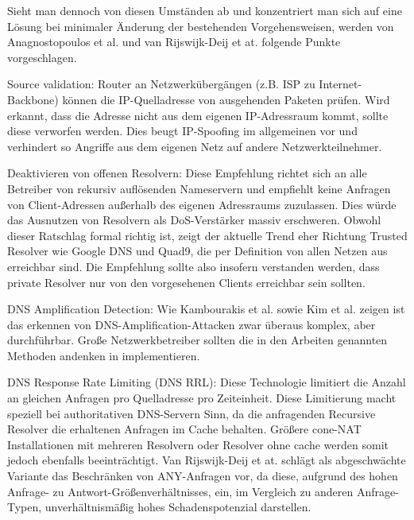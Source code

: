 Sieht man dennoch von diesen Umständen ab und konzentriert man sich auf eine Lösung bei minimaler Änderung der bestehenden Vorgehensweisen, werden von Anagnostopoulos et al.\cite{Anagnostopoulos2013} und van Rijswijk-Deij et at.\cite{VanRijswijk-Deij2014} folgende Punkte vorgeschlagen.

Source validation: Router an Netzwerkübergängen (z.B. ISP zu Internet-Backbone) können die IP-Quelladresse von ausgehenden Paketen prüfen. Wird erkannt, dass die Adresse nicht aus dem eigenen IP-Adressraum kommt, sollte diese verworfen werden. Dies beugt IP-Spoofing im allgemeinen vor und verhindert so Angriffe aus dem eigenen Netz auf andere Netzwerkteilnehmer.

Deaktivieren von offenen Resolvern: Diese Empfehlung richtet sich an alle Betreiber von rekursiv auflösenden Nameservern und empfiehlt keine Anfragen von Client-Adressen außerhalb des eigenen Adressraums zuzulassen. Dies würde das Ausnutzen von Resolvern als DoS-Verstärker massiv erschweren. Obwohl dieser Ratschlag formal richtig ist, zeigt der aktuelle Trend eher Richtung Trusted Resolver wie Google DNS und Quad9, die per Definition von allen Netzen aus erreichbar sind. Die Empfehlung sollte also insofern verstanden werden, dass private Resolver nur von den vorgesehenen Clients erreichbar sein sollten.

DNS Amplification Detection: Wie Kambourakis et al.\cite{Kambourakis2008} sowie Kim et al.\cite{Kim2011} zeigen ist das erkennen von DNS-Amplification-Attacken zwar überaus komplex, aber durchführbar. Große Netzwerkbetreiber sollten die in den Arbeiten genannten Methoden andenken in implementieren.

DNS Response Rate Limiting (DNS RRL): Diese Technologie limitiert die Anzahl an gleichen Anfragen pro Quelladresse pro Zeiteinheit. Diese Limitierung macht speziell bei authoritativen DNS-Servern Sinn, da die anfragenden Recursive Resolver die erhaltenen Anfragen im Cache behalten. Größere cone-NAT Installationen mit mehreren Resolvern oder Resolver ohne cache werden somit jedoch ebenfalls beeinträchtigt. Van Rijswijk-Deij et at.\cite{VanRijswijk-Deij2014} schlägt als abgeschwächte Variante das Beschränken von ANY-Anfragen vor, da diese, aufgrund des hohen Anfrage- zu Antwort-Größenverhältnisses, ein, im Vergleich zu anderen Anfrage-Typen, unverhältnismäßig hohes Schadenspotenzial darstellen.